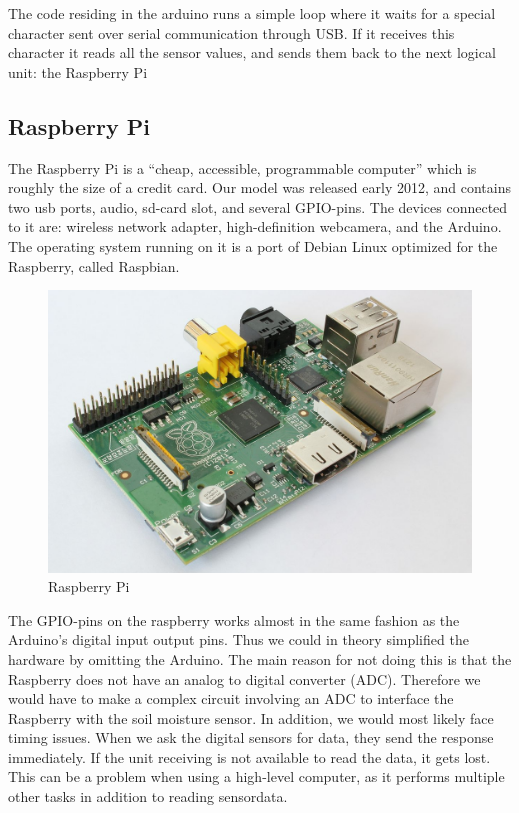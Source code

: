 The code residing in the arduino runs a simple loop where it waits for a special character sent over serial communication through USB. If it receives this character it reads all the sensor values, and sends them back to the next logical unit: the Raspberry Pi

\subsection{Raspberry Pi}
The Raspberry Pi is a “cheap, accessible, programmable computer” \citep{raspberrypi} which is roughly the size of a credit card. Our model was released early 2012, and contains two usb ports, audio, sd-card slot, and several GPIO-pins. The devices connected to it are: wireless network adapter, high-definition webcamera, and the Arduino. The operating system running on it is a port of Debian Linux optimized for the Raspberry, called Raspbian. 

\begin{figure}
\centering
\includegraphics[width=1\textwidth]{img/hardware/1200px-RaspberryPi.jpg}
\caption{Raspberry Pi}
\label{fig:raspberry}
\end{figure}

The GPIO-pins on the raspberry works almost in the same fashion as the Arduino’s digital input output pins. Thus we could in theory simplified the hardware by omitting the Arduino. The main reason for not doing this is that the Raspberry does not have an analog to digital converter (ADC). Therefore we would have to make a complex circuit involving an ADC to interface the Raspberry with the soil moisture sensor. In addition, we would most likely face timing issues. When we ask the digital sensors for data, they send the response immediately. If the unit receiving is not available to read the data, it gets lost. This can be a problem when using a high-level computer, as it performs multiple other tasks in addition to reading sensordata. 

